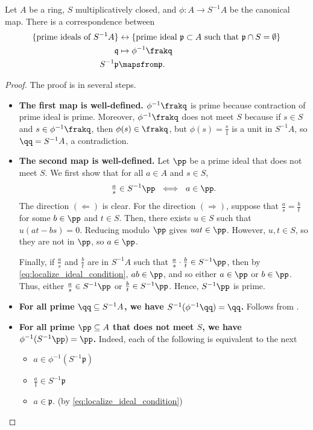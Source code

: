 \begin{theorem}
\label{thm:prime_ideal_localize}
    Let $A$ be a ring, $S$ multiplicatively closed,
    and $\phi : A\to S^{-1}A$ be the canonical map.
    There is a correspondence between
    \begin{align*}
	\{\text{prime ideals of } S^{-1}A\} &\leftrightarrow 
	    \{\text{prime ideal } \mathfrak p\subset A
	    \text{ such that } \mathfrak p\cap S = \emptyset\}
	\\
	\mathfrak q &\mapsto \phi^{-1}\frakq \\
	S^{-1}\mathfrak p &\mapsfrom \mathfrak p.
    \end{align*}
\end{theorem}
\begin{proof}
    The proof is in several steps.
    \begin{itemize}
    \item \textbf{The first map is well-defined.}
    $\phi^{-1}\frakq$ is prime because
    contraction of prime ideal is prime.
    Moreover, $\phi^{-1}\frakq$ does not meet $S$ because
    if $s\in S$ and $s\in \phi^{-1}\frakq$,
    then $\phi(s)\in\frakq$, but $\phi(s)=\frac s1$ is a unit
    in $S^{-1}A$, so $\qq=S^{-1}A$, a contradiction.
    
    \item \textbf{The second map is well-defined.}
    Let $\pp$ be a prime ideal that does not meet $S$.
    We first show that for all $a\in A$ and $s\in S$,
    \begin{equation}
        \label{eq:localize_ideal_condition}
        \tfrac as \in S^{-1}\pp\ \iff\ a\in\pp.
    \end{equation}
    The direction $(\Leftarrow)$ is clear.
    For the direction $(\Rightarrow)$, suppose that 
    $\tfrac as = \tfrac bt$ for some $b\in\pp$ and $t\in S$.
    Then, there exists $u\in S$ such that 
    $u(at-bs) = 0$. Reducing modulo $\pp$ gives 
    $uat\in\pp$. However, $u,t\in S$, so they are not in $\pp$,
    so $a\in \pp$.

    Finally, if $\tfrac as$ and $\tfrac bt$ are in 
    $S^{-1}A$ such that $\tfrac as \cdot\tfrac bt\in S^{-1}\pp$,
    then by \eqref{eq:localize_ideal_condition}, 
    $ab\in \pp$, and so either $a\in\pp$ or $b\in\pp$.
    Thus, either $\tfrac as\in S^{-1}\pp$ 
    or $\tfrac bt\in S^{-1}\pp$. Hence, $S^{-1}\pp$ is prime.
    \item \textbf{For all prime $\qq\subseteq S^{-1}A$, 
    we have $S^{-1}(\phi^{-1}\qq)=\qq$.}
    Follows from .
    \item \textbf{For all prime $\pp\subseteq A$
    that does not meet $S$, we have $\phi^{-1}(S^{-1}\pp)
    = \pp$.}
    Indeed, each of the  following is equivalent to the next
    \begin{itemize}
	\item $a\in\phi^{-1}(S^{-1}\mathfrak p)$
	\item $\frac a1\in S^{-1}\mathfrak p$
	\item $a\in \mathfrak p$. (by \eqref{eq:localize_ideal_condition}) \qedhere
    \end{itemize}
    \end{itemize}
\end{proof}
